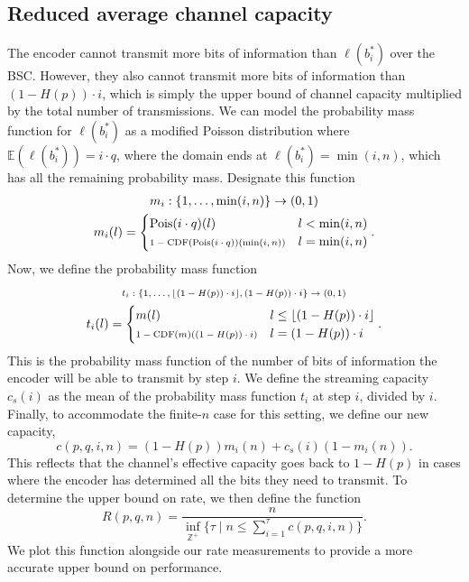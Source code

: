 \documentclass{IEEEtran}
\begin{document}
\subsection{Reduced average channel capacity}
The encoder cannot transmit more bits of information than $\ell(b_i^*)$ over
the BSC. However, they also cannot transmit more bits of information than
$(1-H(p))\cdot i$, which is simply the upper bound of channel capacity multiplied
by the total number of transmissions.
We can model the probability mass function for $\ell(b_i^*)$ as a modified
Poisson distribution where $\mathbb{E}(\ell(b_i^*))=i\cdot q$, where the domain
ends at $\ell(b_i^*)=\min(i,n)$, which has all the remaining probability mass.
Designate this function
\begin{multline}
m_i:\{1,\dots,\min(i,n)\} \to (0,1)\\
	m_i(l) = \begin{cases}
	\mathrm{Pois}(i\cdot q)(l) & l < \min(i,n) \\
        \mbox{\scriptsize $1-\mathrm{CDF}(\mathrm{Pois}(i\cdot q))(\min(i,n))$}
          & l= \min(i,n)
	\end{cases}.
\end{multline}
Now, we
define the probability mass function
\begin{multline}
  \mbox{\scriptsize $t_i: \{1,\dots,\lfloor (1-H(p)) \cdot i\rfloor, (1-H(p))\cdot i\} \to (0,1)$}\\
t_i(l) = \begin{cases}
	m(l) & l \leq \lfloor (1-H(p)) \cdot i\rfloor\\
        \mbox{\scriptsize $1-\mathrm{CDF}(m)((1-H(p))\cdot i)$}
        & l = (1-H(p))\cdot i
\end{cases}.
\end{multline}
This is the probability mass function
of the number of bits of information the encoder will be able to transmit by
step $i$. We define the streaming capacity $c_s(i)$ as the mean of the
probability mass function $t_i$ at step $i$, divided by $i$. Finally, to
accommodate the finite-$n$ case for this setting, we define our new capacity,
\begin{equation}
c(p,q,i,n)=(1-H(p))m_i(n)+c_s(i)(1-m_i(n)).
\end{equation}
This reflects that the channel's effective capacity goes back to $1-H(p)$ in
cases where the encoder has determined all the bits they need to transmit.
To determine the upper bound on rate, we then define the function
\begin{equation}
R(p,q,n)= \frac{n}{\inf_{\mathbb{Z}^+}\{\tau \mid n \leq
\sum_{i=1}^{\tau}c(p,q,i,n) \}}.
\end{equation}
We plot this function alongside our rate measurements to provide a more accurate
upper bound on performance.
\end{document}
